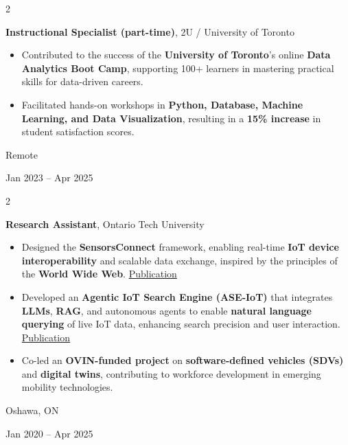 \documentclass[10pt, letterpaper]{article}
\newenvironment{highlights}{
    \begin{itemize}[
        topsep=0.10 cm,
        parsep=0.10 cm,
        partopsep=0pt,
        itemsep=0pt,
        leftmargin=0.4 cm + 10pt
    ]
}{
    \end{itemize}
} %
\newenvironment{twocolentry}[2][]{
    \onecolentry
    \def\secondColumn{#2}
    \setcolumnwidth{\fill, 4.5 cm}
    \begin{paracol}{2}
}{
    \switchcolumn \raggedleft \secondColumn
    \end{paracol}
    \endonecolentry
} %
\let\hrefWithoutArrow\href
\renewcommand{\href}[2]{\hrefWithoutArrow{#1}{#2}}
\begin{document}
\vspace{0.2 cm}
\begin{twocolentry}{
    Remote

    Jan 2023 – Apr 2025
}
    \textbf{Instructional Specialist (part-time)}, 2U / University of Toronto

    \begin{highlights}
        \item Contributed to the success of the \textbf{University of Toronto}'s online \textbf{Data Analytics Boot Camp}, supporting 100+ learners in mastering practical skills for data-driven careers.
        \item Facilitated hands-on workshops in \textbf{Python, Database, Machine Learning, and Data Visualization}, resulting in a \textbf{15\% increase} in student satisfaction scores.
    \end{highlights}
\end{twocolentry}

\vspace{0.2cm}

        \begin{twocolentry}{
    Oshawa, ON

    Jan 2020 – Apr 2025
    }
    \textbf{Research Assistant}, Ontario Tech University
    \begin{highlights}
        \item Designed the \textbf{SensorsConnect} framework, enabling real-time \textbf{IoT device interoperability} and scalable data exchange, inspired by the principles of the \textbf{World Wide Web}. \href{https://ieeexplore.ieee.org/document/10752393}{Publication}
        \item Developed an \textbf{Agentic IoT Search Engine (ASE-IoT)} that integrates \textbf{LLMs}, \textbf{RAG}, and autonomous agents to enable \textbf{natural language querying} of live IoT data, enhancing search precision and user interaction. \href{https://arxiv.org/abs/2503.12255}{Publication}
        \item Co-led an \textbf{OVIN-funded project} on \textbf{software-defined vehicles (SDVs)} and \textbf{digital twins}, contributing to workforce development in emerging mobility technologies.
    \end{highlights}
\end{twocolentry}



    
\end{document}
